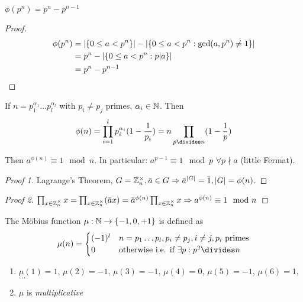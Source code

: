 \documentclass[NumTh.tex]{subfiles}
\begin{document}
\begin{lemma}
  $\phi(p^n) = p^n - p^{n-1}$
\end{lemma}

\begin{proof}
  \begin{align*}
    \phi(p^n) &= \left\vert{\left\{0 \leq a < p^n\right\}}\right\vert - \left\vert{\left\{0 \leq a < p^n : \gcd(a,p^n) \neq 1\right\}}\right\vert \\
              &= p^n - \left\vert{\left\{0 \leq a < p^n : p|a\right\}}\right\vert \\
              &= p^n - p^{n-1}
  \end{align*}
\end{proof}

\begin{prop}
  If $n = p_1^{\alpha_1} \dots p_l^{\alpha_l}$ with $p_i \neq p_j$ primes, $\alpha_i \in \mathbb{N}$.
  Then
  \[ \phi(n) = \prod_{i=1}^l p_i^{\alpha_i} (1 - \frac{1}{p_i}) = n \prod_{p\divides n} (1 - \frac{1}{p}) \]
\end{prop}

\begin{theorem}
  Then $a^{\phi(n)} \equiv 1 \mod n$.
  In particular: $a^{p-1} \equiv 1 \mod p$ $\forall p \nmid a$ (little Fermat).
\end{theorem}

\begin{proof}[Proof 1]
  Lagrange's Theorem, $G = \Z_n^\times, \overbar{a} \in G \Rightarrow \overbar{a}^{|G|} = \overbar{1}, |G| = \phi(n)$.
\end{proof}

\begin{proof}[Proof 2]
  $\prod_{x \in \Z_n^\times} x = \prod_{x \in \Z_n^\times} (\overbar{a}x) = \overbar{a}^{\phi(n)} \prod_{x \in \Z_n^\times} x \Rightarrow a^{\phi(n)} \equiv 1 \mod n$ 
\end{proof}

\begin{defi}
  The Möbius function $\mu: \mathbb{N} \to \{-1,0,+1\}$ is defined as
  \[
	\mu(n) = \begin{cases}
	  (-1)^l & n = p_1 \dots p_l, p_i \neq p_j, i \neq j, p_i \text{ primes} \\
	  0       & \text{otherwise i.e. if } \exists p: p^2 \divides n
	\end{cases}
  \]
\end{defi}

\begin{rem}\hfill
  \begin{enumerate}
    \item $\mu(1) = 1$, $\mu(2) = -1$, $\mu(3) = -1$, $\mu(4) = 0$, $\mu(5) = -1$, $\mu(6) = 1$, $\dots$
    \item $\mu$ is \emph{multiplicative}
  \end{enumerate}
\end{rem}
\end{document}
